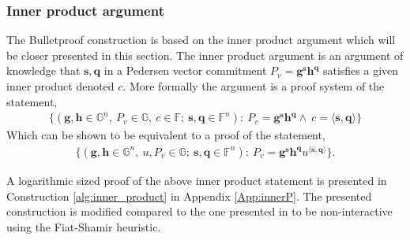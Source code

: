 \subsubsection*{Inner product argument}
\label{sec:inner_prod}
The Bulletproof construction is based on the inner product argument which will be closer presented in this section. The inner product argument is an argument of knowledge that $\textbf{s},\mathbf{q}$ in a Pedersen vector commitment $P_v=\mathbf{g}^\mathbf{s}\mathbf{h}^\mathbf{q}$ satisfies a given inner product denoted $c$. 
More formally the argument is a proof system of the statement,
\begin{align*}
    \{(\mathbf{g},\mathbf{h}\in\mathds{G}^n,\:P_v\in\mathds{G},\:c\in\mathds{F};\: \mathbf{s},\mathbf{q}\in\mathds{F}^n) : \: P_v=\mathbf{g}^\mathbf{s}\mathbf{h}^\mathbf{q}\wedge\: c =\langle\mathbf{s},\mathbf{q}\rangle\}
\end{align*}
Which can be shown to be equivalent to a proof of the statement,
\begin{align*}
    \{(\mathbf{g},\mathbf{h}\in\mathds{G}^n,\: u,P_v\in\mathds{G};\: \mathbf{s},\mathbf{q}\in\mathds{F}^n) : \: P_v=\mathbf{g}^\mathbf{s}\mathbf{h}^\mathbf{q}u^{\langle\mathbf{s},\mathbf{q}\rangle}\}.
\end{align*}

A logarithmic sized proof of the above inner product statement is presented in Construction \ref{alg:inner_product} in Appendix \ref{App:innerP}. The presented  construction is modified compared to the one presented in \cite{bulletProofs_theory} to be non-interactive using the Fiat-Shamir heuristic.

